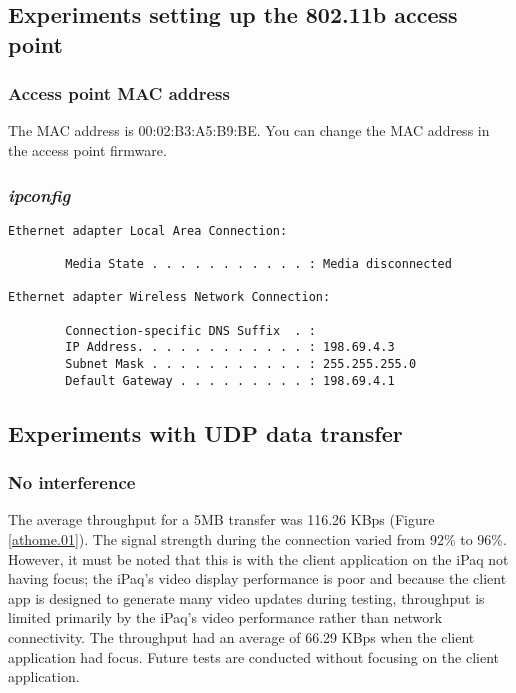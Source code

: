 \documentclass[11pt]{article}
\begin{document}
\subsection{Experiments setting up the 802.11b access point}

\subsubsection{Access point MAC address}

The MAC address is 00:02:B3:A5:B9:BE.  You can change the MAC address in the
access point firmware.

\newpage

\subsubsection{\emph{ipconfig}}

\begin{verbatim}
Ethernet adapter Local Area Connection:

        Media State . . . . . . . . . . . : Media disconnected

Ethernet adapter Wireless Network Connection:

        Connection-specific DNS Suffix  . :
        IP Address. . . . . . . . . . . . : 198.69.4.3
        Subnet Mask . . . . . . . . . . . : 255.255.255.0
        Default Gateway . . . . . . . . . : 198.69.4.1
\end{verbatim}

\subsection{Experiments with UDP data transfer}

\subsubsection{No interference}

The average throughput for a 5MB transfer was 116.26 KBps (Figure \ref{athome.01}). The signal strength during the connection varied from 92\% to 96\%. However, it must be noted that this is with the client application on the iPaq not having focus; the iPaq's video display performance is poor and because the client app is designed to generate many video updates during testing, throughput is limited primarily by the iPaq's video performance rather than network connectivity. The throughput had an average of 66.29 KBps when the client application had focus. Future tests are conducted without focusing on the client application.
\end{document}

